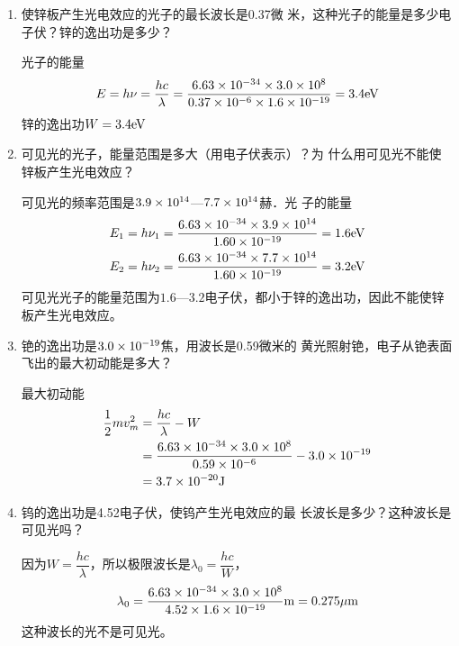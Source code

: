 \begin{enumerate}
    \item 使锌板产生光电效应的光子的最长波长是0.37微
米，这种光子的能量是多少电子伏？锌的逸出功是多少？

\begin{solution}
光子的能量
\[E=h\nu=\frac{hc}{\lambda}=\frac{6.63\times 10^{-34}\times 3.0\times 10^8}{0.37\times 10^{-6}\times 1.6\times 10^{-19}}=3.4{\rm eV}\]
锌的逸出功$W=3.4{\rm eV}$
\end{solution}
\item 可见光的光子，能量范围是多大（用电子伏表示）？为
什么用可见光不能使锌板产生光电效应？

\begin{solution}
可见光的频率范围是$3.9\times10^{14}$—$7.7\times10^{14}$赫．光
子的能量
\[\begin{split}
E_1&=h\nu_1=\frac{6.63\times 10^{-34}\times 3.9\times10^{14}}{1.60\times10^{-19}}=1.6{\rm eV}\\
E_2&=h\nu_2=\frac{6.63\times 10^{-34}\times 7.7\times10^{14}}{1.60\times10^{-19}}=3.2{\rm eV}\\
\end{split}\]
可见光光子的能量范围为$1.6$—$3.2$电子伏，都小于锌的逸出功，因此不能使锌板产生光电效应。
\end{solution}
\item 铯的逸出功是$3.0\times10^{-19}$焦，用波长是0.59微米的
黄光照射铯，电子从铯表面飞出的最大初动能是多大？

\begin{solution}
最大初动能
\[\begin{split}
    \frac{1}{2}mv^2_m &=\frac{hc}{\lambda}-W\\
    &=\frac{6.63\times 10^{-34}\times 3.0\times 10^8}{0.59\times 10^{-6}}-3.0\times 10^{-19}\\
    &=3.7\times 10^{-20}{\rm J}
\end{split}\]
\end{solution}
\item 钨的逸出功是4.52电子伏，使钨产生光电效应的最
长波长是多少？这种波长是可见光吗？

\begin{solution}
因为$W=\dfrac{hc}{\lambda}$，所以极限波长是$\lambda_0=\dfrac{hc}{W}$，
\[\lambda_0=\frac{6.63\times 10^{-34}\times 3.0\times 10^8}{4.52\times 1.6\times 10^{-19}}{\rm m}=0.275\mu{\rm m}\]
这种波长的光不是可见光。
\end{solution}
\end{enumerate}



